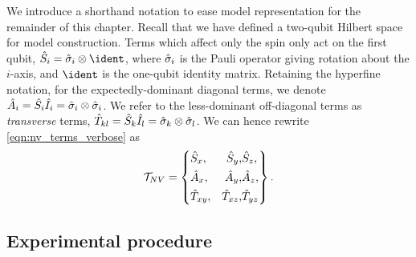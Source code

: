 We introduce a shorthand notation to ease model representation for the remainder of this chapter. 
Recall that we have defined a two-qubit Hilbert space for model construction.
Terms which affect only the spin only act on the first qubit, $\hat{S}_i = \s_i \otimes \ident$, 
    where $\hat{\sigma}_i$ is the Pauli operator giving rotation about the $i$-axis, and 
    $\ident$ is the one-qubit identity matrix. 
Retaining the hyperfine notation, for the expectedly-dominant diagonal terms, we denote $\hat{A}_i = \hat{S}_i \hat{I}_i = \hat{\sigma}_i \otimes \hat{\sigma}_i$. 
We refer to the less-dominant off-diagonal terms as \emph{transverse} terms, $\hat{T}_{kl} = \hat{S}_k \hat{I}_l = \hat{\sigma}_k \otimes \hat{\sigma}_l$. 
We can hence rewrite \cref{eqn:nv_terms_verbose} as 
\begin{equation}
    \label{eqn:nv_terms}
    { \mathcal{T} }_{NV} = \left\{ 
        \begin{split}    
            &\hat{S}_x, &\hat{S}_y,  &\hat{S}_z, \\
            &\hat{A}_x,  &\hat{A}_y,  &\hat{A}_z, \\
            &\hat{T}_{xy},  &\hat{T}_{xz}, &\hat{T}_{yz} 
        \end{split}
    \right\}.
\end{equation}


\subsection{Experimental procedure}

